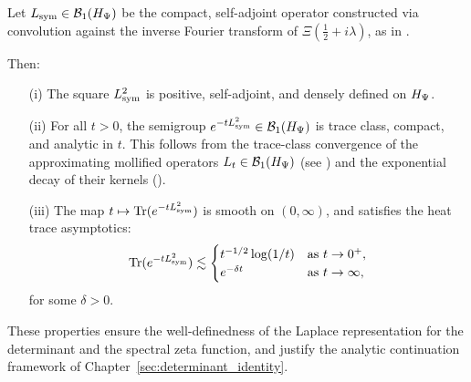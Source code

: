 \begin{lemma}
\label{lem:heat_semigroup_wellposed}
Let \( L_{\mathrm{sym}} \in \mathcal{B}_1(H_{\Psi}) \) be the compact, self-adjoint operator constructed via convolution against the inverse Fourier transform of \( \Xi\left( \tfrac{1}{2} + i\lambda \right) \), as in .

Then:

\begin{enumerate}
    \item[\textnormal{(i)}] The square \( L_{\mathrm{sym}}^2 \) is positive, self-adjoint, and densely defined on \( H_{\Psi} \).

    \item[\textnormal{(ii)}] For all \( t > 0 \), the semigroup \( e^{-t L_{\mathrm{sym}}^2} \in \mathcal{B}_1(H_{\Psi}) \) is trace class, compact, and analytic in \( t \). This follows from the trace-class convergence of the approximating mollified operators \( L_t \in \mathcal{B}_1(H_{\Psi}) \) (see ) and the exponential decay of their kernels ().

    \item[\textnormal{(iii)}] The map \( t \mapsto \operatorname{Tr}(e^{-t L_{\mathrm{sym}}^2}) \) is smooth on \( (0, \infty) \), and satisfies the heat trace asymptotics:
    \[
    \operatorname{Tr}(e^{-t L_{\mathrm{sym}}^2}) \lesssim
    \begin{cases}
    t^{-1/2} \log(1/t) & \text{as } t \to 0^+, \\
    e^{-\delta t} & \text{as } t \to \infty,
    \end{cases}
    \]
    for some \( \delta > 0 \).
\end{enumerate}

\medskip
\noindent
These properties ensure the well-definedness of the Laplace representation for the determinant and the spectral zeta function, and justify the analytic continuation framework of Chapter~\ref{sec:determinant_identity}.
\end{lemma}
